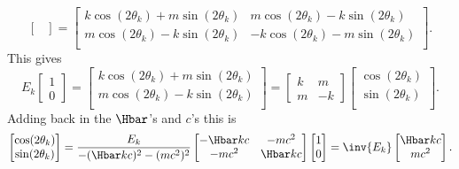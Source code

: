 {\begin{dmath}
\begin{bmatrix}
\end{bmatrix}
=
\begin{bmatrix}
k \cos(2 \theta_k) + m \sin(2 \theta_k) & m \cos(2 \theta_k) - k \sin(2 \theta_k) \\
m \cos(2 \theta_k) - k \sin(2 \theta_k) & -k \cos(2 \theta_k) - m \sin(2 \theta_k) \\
\end{bmatrix}.
\end{dmath}
%
This gives
%
\begin{dmath}\label{eqn:qmLecture9Problems:320}
E_k
\begin{bmatrix}
1 \\
0
\end{bmatrix}
=
\begin{bmatrix}
k \cos(2 \theta_k) + m \sin(2 \theta_k) \\
m \cos(2 \theta_k) - k \sin(2 \theta_k) \\
\end{bmatrix}
=
\begin{bmatrix}
k & m \\
m & -k
\end{bmatrix}
\begin{bmatrix}
\cos(2 \theta_k) \\
\sin(2 \theta_k) \\
\end{bmatrix}.
\end{dmath}
%
Adding back in the \(\Hbar\)'s and \(c\)'s this is
%
\begin{dmath}\label{eqn:qmLecture9Problems:340}
\begin{bmatrix}
\cos(2 \theta_k) \\
\sin(2 \theta_k) \\
\end{bmatrix}
=
\frac{E_k}{-(\Hbar k c)^2 -(m c^2)^2}
\begin{bmatrix}
- \Hbar k c & - m c^2 \\
- m c^2     & \Hbar k c
\end{bmatrix}
\begin{bmatrix}
1 \\
0
\end{bmatrix}
=
\inv{E_k}
\begin{bmatrix}
\Hbar k c \\
m c^2
\end{bmatrix}.
\end{dmath}
%
%
%
}
